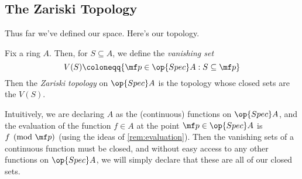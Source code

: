 \documentclass[../notes.tex]{subfiles}
\begin{document}
\subsection{The Zariski Topology}
Thus far we've defined our space. Here's our topology.
\begin{definition} \label{defi:zariski}
	Fix a ring $A$. Then, for $S\subseteq A$, we define the \textit{vanishing set}
	\[V(S)\coloneqq\{\mf p\in\op{Spec}A:S\subseteq\mf p\}\]
	Then the \textit{Zariski topology} on $\op{Spec}A$ is the topology whose closed sets are the $V(S)$.
\end{definition}
Intuitively, we are declaring $A$ as the (continuous) functions on $\op{Spec}A$, and the evaluation of the function $f\in A$ at the point $\mf p\in\op{Spec}A$ is $f\pmod{\mf p}$ (using the ideas of \autoref{rem:evaluation}). Then the vanishing sets of a continuous function must be closed, and without easy access to any other functions on $\op{Spec}A$, we will simply declare that these are all of our closed sets.
\end{document}

